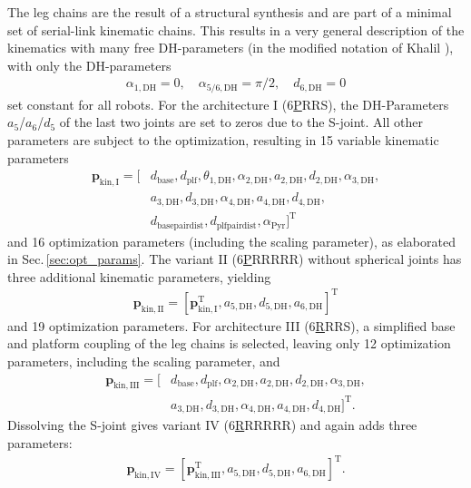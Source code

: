 \documentclass[fleqn,a4paper,10pt]{article}
\newcommand{\bm}[1]{\mathbf{#1}}
\newcommand{\transp}[0]{{\mathrm{T}}}
\begin{document}
\begin{multicols}{2}
The leg chains are the result of a structural synthesis \cite{Ramirez2018} and are part of a minimal set of serial-link kinematic chains.
This results in a very general description of the kinematics with many free DH-parameters (in the modified notation of Khalil \cite{KhalilDom2002}), with only the DH-parameters
%
\begin{align}
\alpha_{1,\mathrm{DH}}=0, \quad \alpha_{5/6,\mathrm{DH}}=\pi/2, \quad  d_{6,\mathrm{DH}}=0
\end{align}
%
set constant for all robots.
For the architecture I (6\underline{P}RRS), the DH-Parameters $a_5$/$a_6$/$d_5$ of the last two joints are set to zeros due to the S-joint.
%
All other parameters are subject to the optimization, resulting in 15 variable kinematic parameters
%
\begin{align}
\bm{p}_\mathrm{kin,I}=[&d_\mathrm{base}, d_\mathrm{plf}, \theta_{1,\mathrm{DH}}, \alpha_{2,\mathrm{DH}}, a_{2,\mathrm{DH}}, d_{2,\mathrm{DH}}, \alpha_{3,\mathrm{DH}}, \nonumber \\
&a_{3,\mathrm{DH}}, d_{3,\mathrm{DH}}, \alpha_{4,\mathrm{DH}},a_{4,\mathrm{DH}}, d_{4,\mathrm{DH}},\nonumber \\
&d_\mathrm{basepairdist}, d_\mathrm{plfpairdist}, \alpha_\mathrm{Pyr} ]^\transp %
\end{align}
%
and 16 optimization parameters (including the scaling parameter), as elaborated in Sec.\,\ref{sec:opt_params}.
The variant II (6\underline{P}RRRRR) without spherical joints has three additional kinematic parameters, yielding
%
%
\begin{align}
\bm{p}_\mathrm{kin,II}=[\bm{p}_\mathrm{kin,I}^\transp,a_{5,\mathrm{DH}},d_{5,\mathrm{DH}},a_{6,\mathrm{DH}}]^\transp
\end{align}
and
19 optimization parameters.
%
For architecture III (6\underline{R}RRS), a simplified base and platform coupling of the leg chains is selected, leaving only 12 optimization parameters, including the scaling parameter, and
%
%
\begin{align}
\bm{p}_\mathrm{kin,III}=[&d_\mathrm{base}, d_\mathrm{plf}, \alpha_{2,\mathrm{DH}}, a_{2,\mathrm{DH}}, d_{2,\mathrm{DH}}, \alpha_{3,\mathrm{DH}}, \nonumber \\
&a_{3,\mathrm{DH}}, d_{3,\mathrm{DH}}, \alpha_{4,\mathrm{DH}},a_{4,\mathrm{DH}}, d_{4,\mathrm{DH}}]^\transp. %
\end{align}
Dissolving the S-joint gives variant IV (6\underline{R}RRRRR) and again adds three parameters:
%
%
\begin{align}
\bm{p}_\mathrm{kin,IV}=[\bm{p}_\mathrm{kin,III}^\transp,a_{5,\mathrm{DH}},d_{5,\mathrm{DH}},a_{6,\mathrm{DH}}]^\transp.
\end{align}


\end{multicols}
\end{document}
